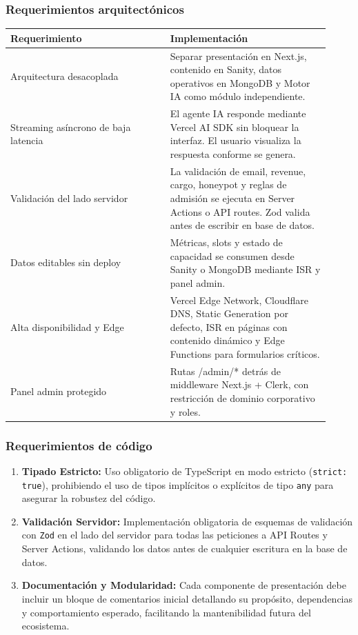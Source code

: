 \documentclass[11pt,letterpaper]{article}
\begin{document}
\subsubsection{Requerimientos arquitectónicos}

\begin{longtable}{p{0.46\linewidth}p{0.46\linewidth}}
\toprule
\textbf{Requerimiento} & \textbf{Implementación} \\
\midrule
Arquitectura desacoplada & Separar presentación en Next.js, contenido en Sanity, datos operativos en MongoDB y Motor IA como módulo independiente. \\
Streaming asíncrono de baja latencia & El agente IA responde mediante Vercel AI SDK sin bloquear la interfaz. El usuario visualiza la respuesta conforme se genera. \\
Validación del lado servidor & La validación de email, revenue, cargo, honeypot y reglas de admisión se ejecuta en Server Actions o API routes. Zod valida antes de escribir en base de datos. \\
Datos editables sin deploy & Métricas, slots y estado de capacidad se consumen desde Sanity o MongoDB mediante ISR y panel admin. \\
Alta disponibilidad y Edge & Vercel Edge Network, Cloudflare DNS, Static Generation por defecto, ISR en páginas con contenido dinámico y Edge Functions para formularios críticos. \\
Panel admin protegido & Rutas /admin/* detrás de middleware Next.js + Clerk, con restricción de dominio corporativo y roles. \\
\bottomrule
\end{longtable}

\subsubsection{Requerimientos de código}

\begin{enumerate}
\item \textbf{Tipado Estricto:} Uso obligatorio de TypeScript en modo estricto (\texttt{strict: true}), prohibiendo el uso de tipos implícitos o explícitos de tipo \texttt{any} para asegurar la robustez del código.
\item \textbf{Validación Servidor:} Implementación obligatoria de esquemas de validación con \texttt{Zod} en el lado del servidor para todas las peticiones a API Routes y Server Actions, validando los datos antes de cualquier escritura en la base de datos.
\item \textbf{Documentación y Modularidad:} Cada componente de presentación debe incluir un bloque de comentarios inicial detallando su propósito, dependencias y comportamiento esperado, facilitando la mantenibilidad futura del ecosistema.
\end{enumerate}
\end{document}
